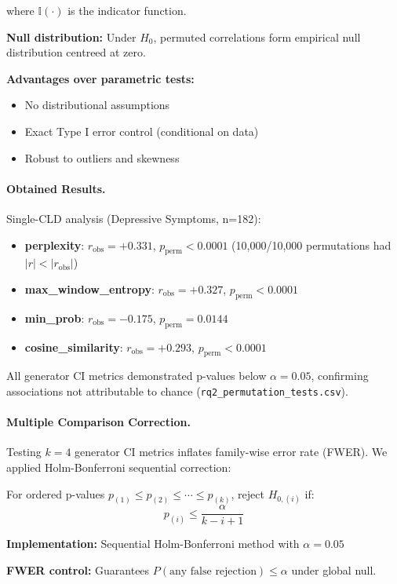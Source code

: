 where \(\mathbb{I}(\cdot)\) is the indicator function.

\textbf{Null distribution:} Under \(H_0\), permuted correlations form empirical null distribution centreed at zero.

\textbf{Advantages over parametric tests:}
\begin{itemize}
    \item No distributional assumptions
    \item Exact Type I error control (conditional on data)
    \item Robust to outliers and skewness
\end{itemize}

\paragraph{Obtained Results.} Single-CLD analysis (Depressive Symptoms, n=182):
\begin{itemize}
    \item \textbf{perplexity}: \(r_{\text{obs}} = +0.331\), \(p_{\text{perm}} < 0.0001\) (10,000/10,000 permutations had \(|r| < |r_{\text{obs}}|\))
    \item \textbf{max\_window\_entropy}: \(r_{\text{obs}} = +0.327\), \(p_{\text{perm}} < 0.0001\)
    \item \textbf{min\_prob}: \(r_{\text{obs}} = -0.175\), \(p_{\text{perm}} = 0.0144\)
    \item \textbf{cosine\_similarity}: \(r_{\text{obs}} = +0.293\), \(p_{\text{perm}} < 0.0001\)
\end{itemize}

All generator CI metrics demonstrated p-values below \(\alpha = 0.05\), confirming associations not attributable to chance (\texttt{rq2\_permutation\_tests.csv}).

\paragraph{Multiple Comparison Correction.} Testing \(k = 4\) generator CI metrics inflates family-wise error rate (FWER). We applied Holm-Bonferroni sequential correction:

For ordered p-values \(p_{(1)} \leq p_{(2)} \leq \cdots \leq p_{(k)}\), reject \(H_{0,(i)}\) if:
\[
p_{(i)} \leq \frac{\alpha}{k - i + 1}
\]

\textbf{Implementation:} Sequential Holm-Bonferroni method with \(\alpha = 0.05\)

\textbf{FWER control:} Guarantees \(P(\text{any false rejection}) \leq \alpha\) under global null.

